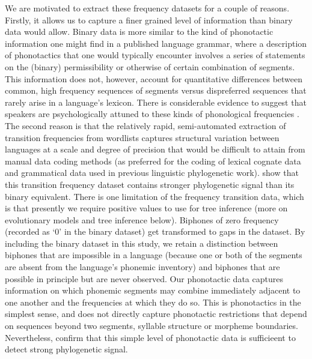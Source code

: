 \documentclass[]{article}
\begin{document}
We are motivated to extract these frequency datasets for a couple of reasons. Firstly, it allows us to capture a finer grained level of information than binary data would allow. Binary data is more similar to the kind of phonotactic information one might find in a published language grammar, where a description of phonotactics that one would typically encounter involves a series of statements on the (binary) permissibility or otherwise of certain combination of segments. This information does not, however, account for quantitative differences between common, high frequency sequences of segments versus dispreferred sequences that rarely arise in a language's lexicon. There is considerable evidence to suggest that speakers are psychologically attuned to these kinds of phonological frequencies \autocites{coleman_stochastic_1997}{zuraw_patterned_2000}{ernestus_predicting_2003}{albright_rules_2003}{eddington_spanish_2004}{hayes_stochastic_2006}{gordon_phonological_2016}. The second reason is that the relatively rapid, semi-automated extraction of transition frequencies from wordlists captures structural variation between languages at a scale and degree of precision that would be difficult to attain from manual data coding methods (as preferred for the coding of lexical cognate data and grammatical data used in previous linguistic phylogenetic work). \textcite{macklin-cordes_phylogenetic_2020} show that this transition frequency dataset contains stronger phylogenetic signal than its binary equivalent. There is one limitation of the frequency transition data, which is that presently we require positive values to use for tree inference (more on evolutionary models and tree inference below). Biphones of zero frequency (recorded as `0' in the binary dataset) get transformed to gaps in the dataset. By including the binary dataset in this study, we retain a distinction between biphones that are impossible in a language (because one or both of the segments are absent from the language's phonemic inventory) and biphones that are possible in principle but are never observed. Our phonotactic data captures information on which phonemic segments may combine immediately adjacent to one another and the frequencies at which they do so. This is phonotactics in the simplest sense, and does not directly capture phonotactic restrictions that depend on sequences beyond two segments, syllable structure or morpheme boundaries. Nevertheless, \textcite{macklin-cordes_phylogenetic_2020} confirm that this simple level of phonotactic data is sufficieent to detect strong phylogenetic signal.
\end{document}

